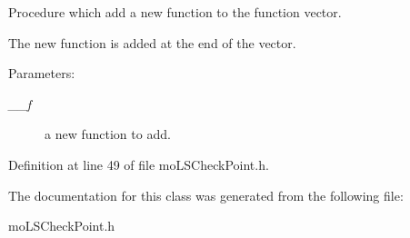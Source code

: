 Procedure which add a new function to the function vector. 

The new function is added at the end of the vector. \begin{Desc}
\item[Parameters:]
\begin{description}
\item[{\em \_\-\_\-f}]a new function to add. \end{description}
\end{Desc}


Definition at line 49 of file mo\-LSCheck\-Point.h.

The documentation for this class was generated from the following file:\begin{CompactItemize}
\item 
mo\-LSCheck\-Point.h\end{CompactItemize}
